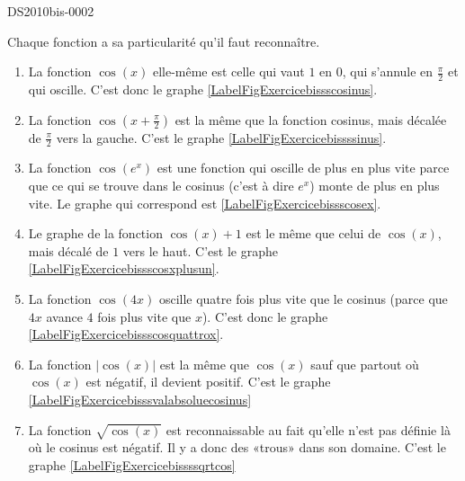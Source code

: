 
\begin{corrige}{DS2010bis-0002}

	Chaque fonction a sa particularité qu'il faut reconnaître.
	\begin{enumerate}
		\item
			La fonction $\cos(x)$ elle-même est celle qui vaut $1$ en $0$, qui s'annule en $\frac{ \pi }{2}$ et qui oscille. C'est donc le graphe \ref{LabelFigExercicebissscosinus}.
		\item
			La fonction $\cos(x+\frac{ \pi }{2})$ est la même que la fonction cosinus, mais décalée de $\frac{ \pi }{2}$ vers la gauche. C'est le graphe  \ref{LabelFigExercicebissssinus}.
		\item
			La fonction $\cos( e^{x})$ est une fonction qui oscille de plus en plus vite parce que ce qui se trouve dans le cosinus (c'est à dire  $ e^{x}$) monte de plus en plus vite. Le graphe qui correspond est \ref{LabelFigExercicebissscosex}.
		\item
			Le graphe de la fonction $\cos(x)+1$ est le même que celui de $\cos(x)$, mais décalé de $1$ vers le haut. C'est le graphe \ref{LabelFigExercicebissscosxplusun}.
		\item
			La fonction $\cos(4x)$ oscille quatre fois plus vite que le cosinus (parce que $4x$ avance $4$ fois plus vite que $x$). C'est donc le graphe \ref{LabelFigExercicebissscosquattrox}.
		\item
			La fonction $| \cos(x) |$ est la même que $\cos(x)$ sauf que partout où $\cos(x)$ est négatif, il devient positif. C'est le graphe \ref{LabelFigExercicebisssvalabsoluecosinus}
		\item
			La fonction $\sqrt{\cos(x)}$ est reconnaissable au fait qu'elle n'est pas définie là où le cosinus est négatif. Il y a donc des «trous» dans son domaine. C'est le graphe \ref{LabelFigExercicebissssqrtcos}
	\end{enumerate}
	

\end{corrige}
